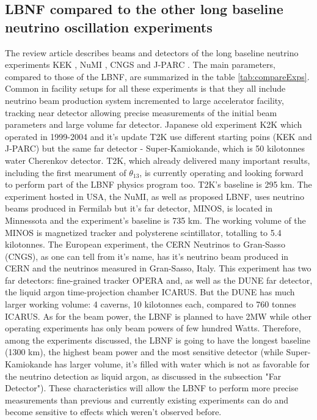 \subsection{LBNF compared to the other long baseline neutrino oscillation experiments}
The review article \cite{ref_LBN_OscExpReview} describes beams and detectors of the long baseline neutrino experiments KEK \cite{ref_KEK}, NuMI \cite{ref_NuMI}, CNGS \cite{ref_CNGS} and J-PARC \cite{ref_JPARC}. The main parameters, compared to those of the LBNF, are summarized in the table \ref{tab:compareExps}. Common in facility setups for all these experiments is that they all include neutrino beam production system incremented to large accelerator facility, tracking near detector allowing precise measurements of the initial beam parameters and large volume far detector. Japanese old experiment K2K which operated in 1999-2004 and it's update T2K use different starting poins (KEK and J-PARC) but the same far detector - Super-Kamiokande, which is 50 kilotonnes water Cherenkov detector. T2K, which already delivered many important results, including the first mearument of $\theta_{13}$, is currently operating and looking forward to perform part of the LBNF physics program too. T2K's baseline is 295 km. The experiment hosted in USA, the NuMI, as well as proposed LBNF, uses neutrino beams produced in Fermilab but it's far detector, MINOS, is located in Minnessota and the experiment's baseline is 735 km. The working volume of the MINOS is magnetized tracker and polysterene scintillator, totalling to 5.4 kilotonnes. The European experiment, the CERN Neutrinos to Gran-Sasso (CNGS), as one can tell from it's name, has it's neutrino beam produced in CERN and the neutrinos measured in Gran-Sasso, Italy. This experiment has two far detectors: fine-grained tracker OPERA and, as well as the DUNE far detector, the liquid argon time-projection chamber ICARUS. But the DUNE has much larger working volume: 4 caverns, 10 kilotonnes each, compared to 760 tonnes ICARUS. As for the beam power, the LBNF is planned to have 2MW while other operating experiments has only beam powers of few hundred Watts. Therefore, among the experiments discussed, the LBNF is going to have the longest baseline (1300 km), the highest beam power and the most sensitive detector (while Super-Kamiokande has larger volume, it's filled with water which is not as favorable for the neutrino detection as liquid argon, as discussed in the subsection "Far Detector"). These characteristics will allow the LBNF to perform more precise measurements than previous and currently existing experiments can do and become sensitive to effects which weren't observed before.

